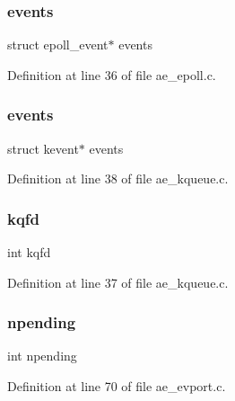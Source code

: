 \subsubsection{\texorpdfstring{events}{events}\hspace{0.1cm}{\footnotesize\ttfamily [1/2]}}
{\footnotesize\ttfamily struct epoll\+\_\+event$\ast$ events}



Definition at line 36 of file ae\+\_\+epoll.\+c.

\mbox{\label{structae_api_state_ac4b7894707b47b577951136ff0c44929}} 
\subsubsection{\texorpdfstring{events}{events}\hspace{0.1cm}{\footnotesize\ttfamily [2/2]}}
{\footnotesize\ttfamily struct kevent$\ast$ events}



Definition at line 38 of file ae\+\_\+kqueue.\+c.

\mbox{\label{structae_api_state_aa16ac46da03ffb75e8913e2b978ad813}} 
\subsubsection{\texorpdfstring{kqfd}{kqfd}}
{\footnotesize\ttfamily int kqfd}



Definition at line 37 of file ae\+\_\+kqueue.\+c.

\mbox{\label{structae_api_state_a6f4c81b06defc657dcf060888fa72ad2}} 
\subsubsection{\texorpdfstring{npending}{npending}}
{\footnotesize\ttfamily int npending}



Definition at line 70 of file ae\+\_\+evport.\+c.


